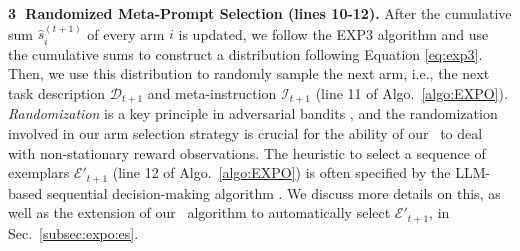 \textbf{{\textcircled{\scriptsize 3}} Randomized Meta-Prompt Selection (lines 10-12).}
After the cumulative sum $\hat{s}_i^{(t+1)}$
of every arm $i$ is updated, 
we 
follow the EXP3 algorithm \cite{lattimore2020bandit} and use the cumulative sums to
construct a distribution following Equation \eqref{eq:exp3}.
Then, we use this distribution to randomly sample the next arm,
i.e., the next task description $\mathcal{D}_{t+1}$ and meta-instruction $\mathcal{I}_{t+1}$ (line 11 of Algo.~\ref{algo:EXPO}).
\emph{Randomization} is a key principle in adversarial bandits \cite{lattimore2020bandit}, and the randomization involved in our arm selection strategy is crucial for the ability of our \alg~to deal with non-stationary reward observations.
The heuristic to select a sequence of exemplars $\mathcal{E}'_{t+1}$ (line 12 of Algo.~\ref{algo:EXPO}) is often specified by the LLM-based sequential decision-making algorithm \cite{yang2023large}. We discuss more details on this, as well as the extension of our \alg~algorithm to automatically select $\mathcal{E}'_{t+1}$, in Sec.~\ref{subsec:expo:es}.

